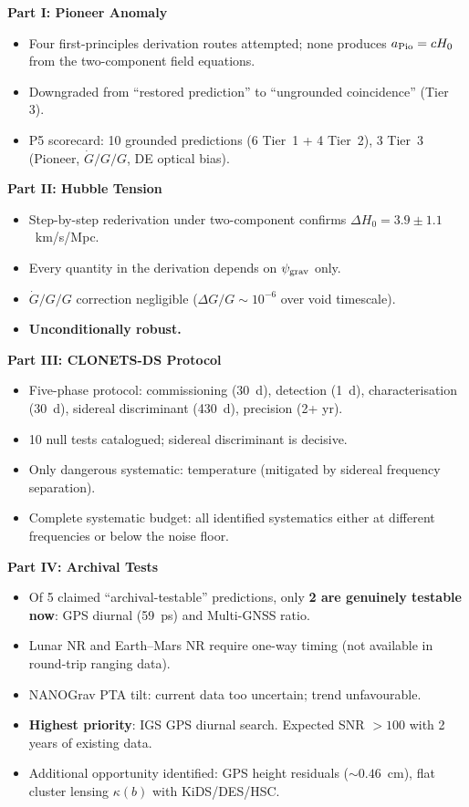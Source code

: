 \documentclass[11pt]{article}
\newcommand{\psigrav}{\psi_{\rm grav}}
\newcommand{\Hzero}{H_0}
\newcommand{\Gdot}{\dot{G}/G}
\begin{document}
\begin{tcolorbox}[colback=blue!5!white, colframe=blue!60!black,
  title=\textbf{W3i7 P5+P13 Summary}]

\textbf{Part I: Pioneer Anomaly}
\begin{itemize}[nosep]
\item Four first-principles derivation routes attempted; none produces
  $a_{\rm Pio} = c\Hzero$ from the two-component field equations.
\item Downgraded from ``restored prediction'' to ``ungrounded
  coincidence'' (Tier 3).
\item P5 scorecard: 10 grounded predictions (6 Tier~1 + 4 Tier~2),
  3 Tier~3 (Pioneer, $\Gdot/G$, DE optical bias).
\end{itemize}

\textbf{Part II: Hubble Tension}
\begin{itemize}[nosep]
\item Step-by-step rederivation under two-component confirms
  $\Delta\Hzero = 3.9 \pm 1.1$~km/s/Mpc.
\item Every quantity in the derivation depends on $\psigrav$ only.
\item $\Gdot/G$ correction negligible ($\Delta G/G \sim 10^{-6}$
  over void timescale).
\item \textbf{Unconditionally robust.}
\end{itemize}

\textbf{Part III: CLONETS-DS Protocol}
\begin{itemize}[nosep]
\item Five-phase protocol: commissioning (30~d), detection (1~d),
  characterisation (30~d), sidereal discriminant (430~d), precision (2+ yr).
\item 10 null tests catalogued; sidereal discriminant is decisive.
\item Only dangerous systematic: temperature (mitigated by sidereal
  frequency separation).
\item Complete systematic budget: all identified systematics either at
  different frequencies or below the noise floor.
\end{itemize}

\textbf{Part IV: Archival Tests}
\begin{itemize}[nosep]
\item Of 5 claimed ``archival-testable'' predictions, only \textbf{2
  are genuinely testable now}: GPS diurnal (59~ps) and Multi-GNSS ratio.
\item Lunar NR and Earth--Mars NR require one-way timing (not available
  in round-trip ranging data).
\item NANOGrav PTA tilt: current data too uncertain; trend unfavourable.
\item \textbf{Highest priority}: IGS GPS diurnal search. Expected
  SNR $> 100$ with 2 years of existing data.
\item Additional opportunity identified: GPS height residuals ($\sim 0.46$~cm),
  flat cluster lensing $\kappa(b)$ with KiDS/DES/HSC.
\end{itemize}


\end{tcolorbox}
\end{document}

